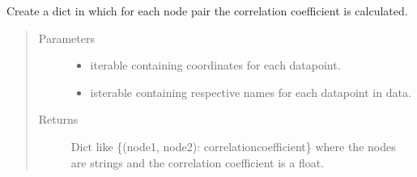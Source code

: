 \documentclass[letterpaper,10pt,english]{sphinxmanual}
\begin{document}
\begin{fulllineitems}
\label{\detokenize{clustering:clustering.overallCorrelationcoefficients}}
\sphinxAtStartPar
Create a dict in which for each node pair the correlation coefficient is calculated.
\begin{quote}\begin{description}
\item[{Parameters}] \leavevmode\begin{itemize}
\item {} 
\sphinxAtStartPar
{} \textendash{} iterable containing coordinates for each datapoint.

\item {} 
\sphinxAtStartPar
{} \textendash{} isterable containing respective names for each datapoint in data.

\end{itemize}

\item[{Returns}] \leavevmode
\sphinxAtStartPar
Dict like \{(node1, node2): correlationcoefficient\} where the nodes are strings and the correlation coefficient is a float.

\end{description}\end{quote}

\end{fulllineitems}

\end{document}
